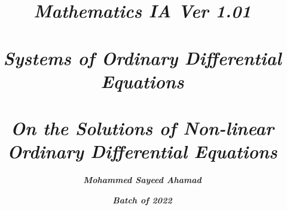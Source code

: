 \title{\textit{\textbf{Mathematics IA Ver 1.01 \\ \vspace{2 cm} \\ Systems of Ordinary Differential Equations} \\ \vspace*{2.5 cm} \\ On the Solutions of Non-linear Ordinary Differential Equations}}
\author{\textit{\textbf{Mohammed Sayeed Ahamad}}}
\date{\textit{\textbf{Batch of 2022}}}


